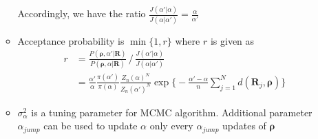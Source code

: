 \documentclass[12pt]{article}
\begin{document}
\begin{itemize}
\begin{itemize}
        Accordingly, we have the ratio $\frac{J(\alpha'|\alpha)}{J(\alpha|\alpha')}=\frac{\alpha}{\alpha'}$ 
        \item Acceptance probability is $\min\{1, r\}$ where $r$  is given as 
        \begin{align*}
            r &= \frac{P(\boldsymbol{\rho}, \alpha' | \mathbf{R})}{P(\boldsymbol{\rho}, \alpha | \mathbf{R})} \,/\, \frac{J(\alpha'|\alpha)}{J(\alpha|\alpha')} \\ &= \frac{\alpha'}{\alpha}\frac{\pi(\alpha')}{\pi(\alpha)}\frac{Z_n(\alpha)^N}{Z_n(\alpha')^N}\exp \big\{-\frac{\alpha'-\alpha}{n}\sum_{j=1}^N d(\mathbf{R}_j, \boldsymbol{\rho})\big\}
        \end{align*}
        \item $\sigma_\alpha^2$ is a tuning parameter for MCMC algorithm. Additional parameter $\alpha_{jump}$ can be used to update $\alpha$ only every $\alpha_{jump}$ updates of $\boldsymbol{\rho}$
    \end{itemize}
\end{itemize}
\end{document}
